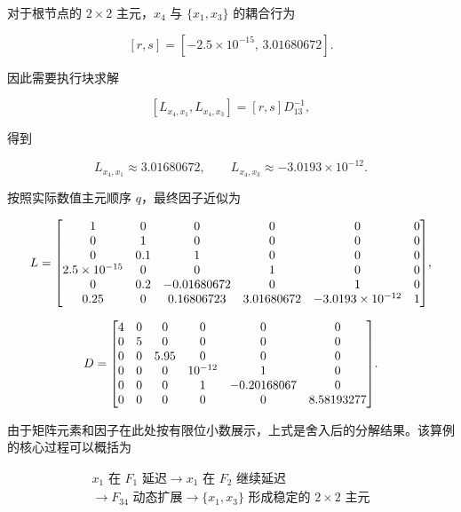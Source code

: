 对于根节点的 $2\times2$ 主元，$x_4$ 与 $\{x_1,x_3\}$ 的耦合行为

\[
[r,s]=[-2.5\times10^{-15},\,3.01680672].
\]

因此需要执行块求解

\[
[L_{x_4,x_1},L_{x_4,x_3}]
=[r,s]D_{13}^{-1},
\]

得到

\[
L_{x_4,x_1}\approx3.01680672,
\qquad
L_{x_4,x_3}\approx-3.0193\times10^{-12}.
\]

按照实际数值主元顺序 $q$，最终因子近似为

\[
\resizebox{0.93\textwidth}{!}{$
L=
\begin{bmatrix}
1&0&0&0&0&0\\
0&1&0&0&0&0\\
0&0.1&1&0&0&0\\
2.5\times10^{-15}&0&0&1&0&0\\
0&0.2&-0.01680672&0&1&0\\
0.25&0&0.16806723&3.01680672&-3.0193\times10^{-12}&1
\end{bmatrix}
$},
\]

\[
\resizebox{0.68\textwidth}{!}{$
D=
\begin{bmatrix}
4&0&0&0&0&0\\
0&5&0&0&0&0\\
0&0&5.95&0&0&0\\
0&0&0&10^{-12}&1&0\\
0&0&0&1&-0.20168067&0\\
0&0&0&0&0&8.58193277
\end{bmatrix}
$}.
\]

由于矩阵元素和因子在此处按有限位小数展示，上式是舍入后的分解结果。该算例的核心过程可以概括为

\[
\boxed{
\begin{gathered}
x_1\text{ 在 }F_1\text{ 延迟}
\longrightarrow
x_1\text{ 在 }F_2\text{ 继续延迟}\\
\longrightarrow
F_{34}\text{ 动态扩展}
\longrightarrow
\{x_1,x_3\}\text{ 形成稳定的 }2\times2\text{ 主元}
\end{gathered}}
\]
